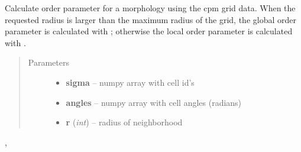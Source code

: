 \documentclass[letterpaper,10pt,english]{sphinxmanual}
\begin{document}

\begin{fulllineitems}
\label{AnalysisUtils:AnalysisUtils.getOrderParameter}
Calculate order parameter for a morphology using the cpm grid data. When the requested radius is larger than the maximum radius of the grid, the global order parameter is calculated with {\hyperref[AnalysisUtils:AnalysisUtils.getGlobalOrderParameter]{}}; otherwise the local order parameter is calculated with {\hyperref[AnalysisUtils:AnalysisUtils.getLocalOrderParameter]{}}.
\begin{quote}\begin{description}
\item[{Parameters}] \leavevmode\begin{itemize}
\item {} 
\textbf{sigma} -- numpy array with cell id's

\item {} 
\textbf{angles} -- numpy array with cell angles (radians)

\item {} 
\textbf{r} (\emph{int}) -- radius of neighborhood

\end{itemize}

\end{description}\end{quote}




{\hyperref[AnalysisUtils:AnalysisUtils.getLocalOrderParameter]{}}, {\hyperref[AnalysisUtils:AnalysisUtils.getGlobalOrderParameter]{}}



\end{fulllineitems}

\end{document}
